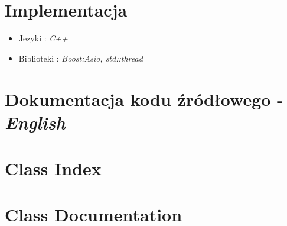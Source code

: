 \documentclass[11pt]{book}
\newcommand{\+}{\discretionary{\mbox{\scriptsize$\hookleftarrow$}}{}{}}
\begin{document}
\chapter{Implementacja}
\begin{itemize}
\item
Jezyki : \textsl{C++}
\item
Biblioteki : \textsl{Boost:Asio, std::thread}
\end{itemize}

\chapter{Dokumentacja kodu źródłowego - \textit{English}}
\label{md_README}

\chapter{Class Index}

\chapter{Class Documentation}











 
\end{document}
